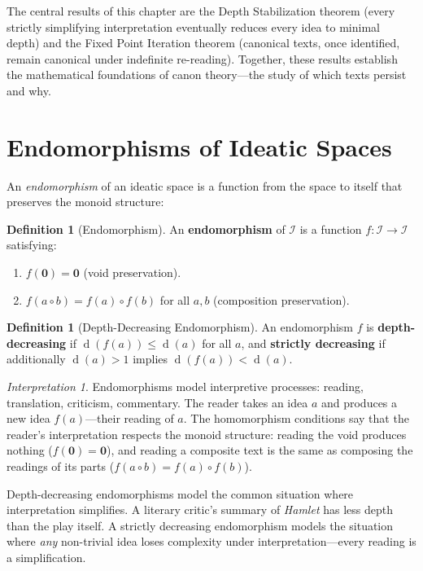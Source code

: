\documentclass[11pt,openany]{book}
\theoremstyle{definition}
\newtheorem{definition}[axiom]{Definition}
\theoremstyle{plain}
\theoremstyle{remark}
\newtheorem{interpretation}[axiom]{Interpretation}
\newcommand{\IS}{\mathcal{I}}               %
\newcommand{\compose}{\circ}                 %
\newcommand{\void}{\mathbf{0}}              %
\newcommand{\depth}{\operatorname{d}}       %
\begin{document}
The central results of this chapter are the Depth Stabilization theorem (every strictly simplifying interpretation eventually reduces every idea to minimal depth) and the Fixed Point Iteration theorem (canonical texts, once identified, remain canonical under indefinite re-reading). Together, these results establish the mathematical foundations of canon theory---the study of which texts persist and why.

\section{Endomorphisms of Ideatic Spaces}

An \emph{endomorphism} of an ideatic space is a function from the space to itself that preserves the monoid structure:

\begin{definition}[Endomorphism]
\label{def:endomorphism}
An \textbf{endomorphism} of $\IS$ is a function $f : \IS \to \IS$ satisfying:
\begin{enumerate}
\item $f(\void) = \void$ (void preservation).
\item $f(a \compose b) = f(a) \compose f(b)$ for all $a, b$ (composition preservation).
\end{enumerate}
\end{definition}

\begin{definition}[Depth-Decreasing Endomorphism]
An endomorphism $f$ is \textbf{depth-decreasing} if $\depth(f(a)) \leq \depth(a)$ for all $a$, and \textbf{strictly decreasing} if additionally $\depth(a) > 1$ implies $\depth(f(a)) < \depth(a)$.
\end{definition}

\begin{interpretation}
Endomorphisms model interpretive processes: reading, translation, criticism, commentary. The reader takes an idea $a$ and produces a new idea $f(a)$---their reading of $a$. The homomorphism conditions say that the reader's interpretation respects the monoid structure: reading the void produces nothing ($f(\void) = \void$), and reading a composite text is the same as composing the readings of its parts ($f(a \compose b) = f(a) \compose f(b)$).

Depth-decreasing endomorphisms model the common situation where interpretation simplifies. A literary critic's summary of \emph{Hamlet} has less depth than the play itself. A strictly decreasing endomorphism models the situation where \emph{any} non-trivial idea loses complexity under interpretation---every reading is a simplification.
\end{interpretation}
\end{document}
